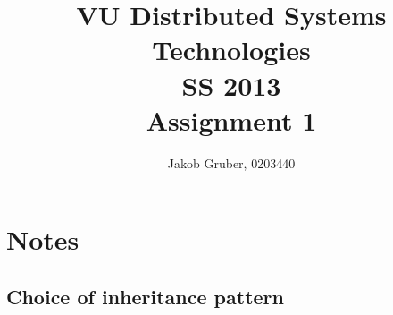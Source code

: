\documentclass[a4paper,10pt]{article}
\title{VU Distributed Systems Technologies \\
       SS 2013 \\
       Assignment 1}
\author{Jakob Gruber, 0203440}
\begin{document}
\maketitle

\section{Notes}

\subsection{Choice of inheritance pattern}
\end{document}
